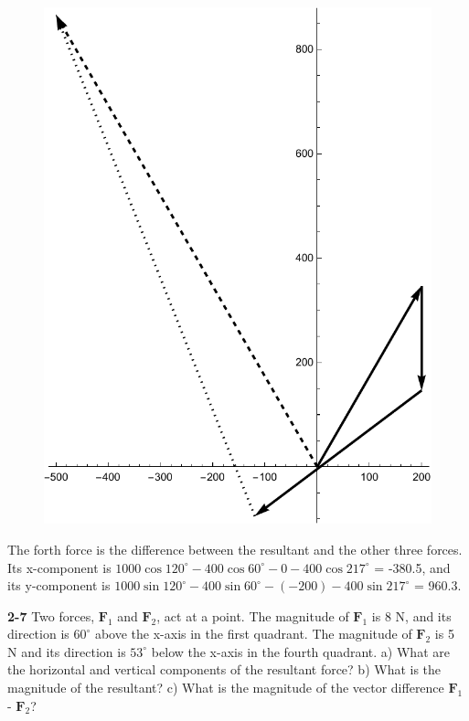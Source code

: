 \documentclass{amsart}
\begin{document}
\begin{figure}[h]
\includegraphics[scale=0.4]{2-6}
\end{figure}

The forth force is the difference between the resultant and the other three forces.
Its x-component is $1000 \cos 120^\circ - 400 \cos 60^\circ - 0 - 400 \cos 217^\circ$ = -380.5,
and its y-component is $1000 \sin 120^\circ - 400 \sin 60^\circ - (-200) - 400 \sin 217^\circ$ = 960.3.

\vspace{\baselineskip}
\noindent
\textbf{2-7} Two forces, $\textbf{F}_1$ and $\textbf{F}_2$, act at a point.
The magnitude of $\textbf{F}_1$ is 8 N, and its direction is $60^\circ$ above the x-axis in the first quadrant.
The magnitude of $\textbf{F}_2$ is 5 N and its direction is $53^\circ$ below the x-axis in the fourth quadrant.\newline
a) What are the horizontal and vertical components of the resultant force?\newline
b) What is the magnitude of the resultant?\newline
c) What is the magnitude of the vector difference $\textbf{F}_1$ - $\textbf{F}_2$?
\end{document}
